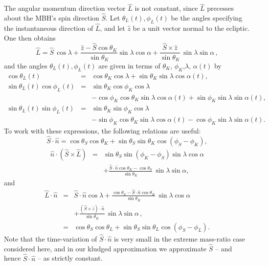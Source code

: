 \documentclass[12pt]{iopart}
\def\be{\begin{equation}}
\def\ee{\end{equation}}
\def\bea{\begin{eqnarray}}
\def\eea{\end{eqnarray}}
\begin{document}
The angular momentum direction vector $\hat L$ is not constant, since $\hat L$ precesses about the MBH's spin
direction $\hat S$.  Let $\theta_L(t),\phi_L(t)$ be the angles specifying the instantaneous direction of $\hat L$, and let $\hat z$ be a unit vector normal to the ecliptic. One then obtains
\be \label{alpha}
\hat L = \hat S \, \cos\lambda +
\frac{\hat z - \hat S \cos\theta_K}{\sin\theta_K} \sin\lambda \cos\alpha
+ \frac{\hat S \times \hat z}{\sin\theta_K}  \, \sin\lambda \sin\alpha\,,
\ee
\noindent
and the angles $\theta_L(t),\phi_L(t)$ are given in terms of $\theta_K$, $\phi_K$,$\lambda$, $\alpha(t)$ by
\begin{eqnarray}\label{relations3}
\cos\theta_L(t) &=& \cos\theta_K \cos\lambda
    +\sin\theta_K\sin\lambda\cos\alpha(t), \nonumber\\
\sin\theta_L(t)\cos\phi_L(t) &=&
\sin\theta_K\cos\phi_K\cos\lambda \nonumber \\
& & -\cos\phi_K\cos\theta_K\sin\lambda\cos\alpha(t)
+\sin\phi_K\sin\lambda\sin\alpha(t),  \nonumber\\
\sin\theta_L(t)\sin\phi_L(t) &=&
\sin\theta_K\sin\phi_K\cos\lambda \nonumber \\
& & -\sin\phi_K\cos\theta_K\sin\lambda\cos\alpha(t)
-\cos\phi_K\sin\lambda\sin\alpha(t).
\end{eqnarray}
%
To work with these expressions, the following relations are useful:
\be
\label{SdotN}
{ \hat S}\cdot{ \hat n} = \cos\theta_S \cos\theta_K
+ \sin\theta_S \sin\theta_K \cos(\phi_S-\phi_K),
\ee
\bea\label{ScrossLdotN}
\hat n \cdot (\hat S \times \hat L) & = &
\sin\theta_S \sin(\phi_K-\phi_S)\sin\lambda \cos\alpha \nonumber \\
& &+ \frac{\hat S\cdot\hat n \cos\theta_K -\cos\theta_S}{\sin\theta_K}
\, \sin\lambda \sin\alpha,
\eea
and
\bea
\label{LdotN}
{ \hat L}\cdot{ \hat n} & = & { \hat S}\cdot{ \hat n}\cos\lambda
+ \frac{\cos\theta_S - \hat S\cdot\hat n \cos\theta_K}{\sin\theta_K}
\, \sin\lambda \cos\alpha \nonumber \\
& & + \frac{(\hat S \times \bar z)\cdot \hat n}
{\sin\theta_K}  \, \sin\lambda \sin\alpha\,, \nonumber \\
& = & \cos\theta_S \cos\theta_L +
\sin\theta_S \sin\theta_L \cos(\phi_S-\phi_L).
\eea
Note that the time-variation of ${ \hat S}\cdot{ \hat n}$ is very small in the extreme mass-ratio case considered here, and in our kludged approximation we approximate $\hat S$ -- and hence ${\hat S}\cdot{\hat n}$ -- as strictly constant.
\end{document}
